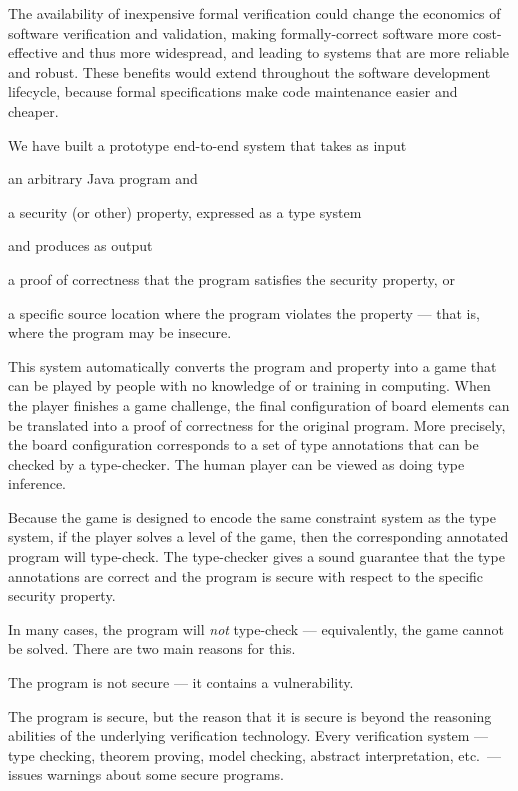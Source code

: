 \documentclass{sig-alternate}
\let\Itemize =\itemize
\let\Enumerate =\enumerate
\def\Nospacing{\itemsep=0pt\topsep=0pt\partopsep=0pt\parskip=0pt\parsep=0pt}
\renewenvironment{itemize}{\Itemize\Nospacing}{\endlist}
\renewenvironment{enumerate}{\Enumerate\Nospacing}{\endlist}
\begin{document}
The availability of inexpensive formal verification could change the
economics of software verification and validation, making
formal\-ly-correct software more cost-effective and thus more
widespread, and  leading to systems that are more reliable and
robust.  
These benefits would extend throughout the software
development lifecycle, because formal specifications make code
maintenance easier and cheaper.


We have built a prototype end-to-end system that takes as input

\begin{itemize}
\item
 an arbitrary Java program and
\item
 a security (or other) property, expressed as a type system
\end{itemize}

\noindent
and produces as output

\begin{itemize}
\item
 a proof of correctness that the program satisfies the security property,
 or
\item
 a specific source location where the program violates the property
 --- that is, where the program may be insecure.
\end{itemize}

This system automatically converts the program and
property into a game that can be played by people with no knowledge of
or training in computing.  When the player finishes a game challenge,
the final configuration of board elements can be translated into a
proof of correctness for the original program.  More precisely, the
board configuration corresponds to a set of type annotations that can
be checked by a type-checker.  The human player can be viewed as doing
type inference.

Because the game is designed to encode the same constraint system as
the type system, if the player solves a level of the game, then the
corresponding annotated program will type-check.  The type-checker
gives a sound guarantee that the type annotations are correct and the
program is secure with respect to the specific security property.

In many cases, the program will \emph{not} type-check ---
equivalently, the game cannot be solved.  There are two main reasons
for this.

\begin{enumerate}
\item
  The program is not secure --- it contains a vulnerability.
\item
  The program is secure, but the reason that it is secure is beyond
  the reasoning abilities of the underlying verification technology.
  Every verification system --- type checking, theorem proving, model
  checking, abstract interpretation, etc.\ --- issues warnings about
  some secure programs.
\end{enumerate}
\end{document}

